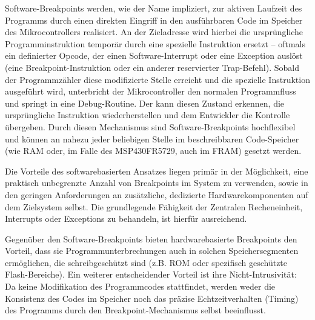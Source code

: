 Software-Breakpoints werden, wie der Name impliziert, zur aktiven Laufzeit des Programms durch einen direkten Eingriff in den ausf\"uhrbaren Code im Speicher des Mikrocontrollers realisiert. An der Zieladresse wird hierbei die urspr\"ungliche Programminstruktion tempor\"ar durch eine spezielle Instruktion ersetzt – oftmals ein definierter Opcode, der einen Software-Interrupt oder eine Exception ausl\"ost (\zB eine Breakpoint-Instruktion oder ein anderer reservierter Trap-Befehl). Sobald der Programmz\"ahler diese modifizierte Stelle erreicht und die spezielle Instruktion ausgef\"uhrt wird, unterbricht der Mikrocontroller den normalen Programmfluss und springt in eine Debug-Routine. Der  kann diesen Zustand erkennen, die urspr\"ungliche Instruktion wiederherstellen und dem Entwickler die Kontrolle \"ubergeben. Durch diesen Mechanismus sind Software-Breakpoints hochflexibel und k\"onnen an nahezu jeder beliebigen Stelle im beschreibbaren Code-Speicher (wie RAM oder, im Falle des MSP430FR5729, auch im FRAM) gesetzt werden.

Die Vorteile des softwarebasierten Ansatzes liegen prim\"ar in der M\"oglichkeit, eine praktisch unbegrenzte Anzahl von Breakpoints im System zu verwenden, sowie in den geringen Anforderungen an zus\"atzliche, dedizierte Hardwarekomponenten auf dem Zielsystem selbst. Die grundlegende F\"ahigkeit der Zentralen Recheneinheit, Interrupts oder Exceptions zu behandeln, ist hierf\"ur ausreichend.

Gegen\"uber den Software-Breakpoints bieten hardwarebasierte Breakpoints den Vorteil, dass sie Programmunterbrechungen auch in solchen Speichersegmenten erm\"oglichen, die schreibgesch\"utzt sind (z.B. ROM oder spezifisch gesch\"utzte Flash-Bereiche). Ein weiterer entscheidender Vorteil ist ihre Nicht-Intrusivit\"at: Da keine Modifikation des Programmcodes stattfindet, werden weder die Konsistenz des Codes im Speicher noch das pr\"azise Echtzeitverhalten (Timing) des Programms durch den Breakpoint-Mechanismus selbst beeinflusst.

